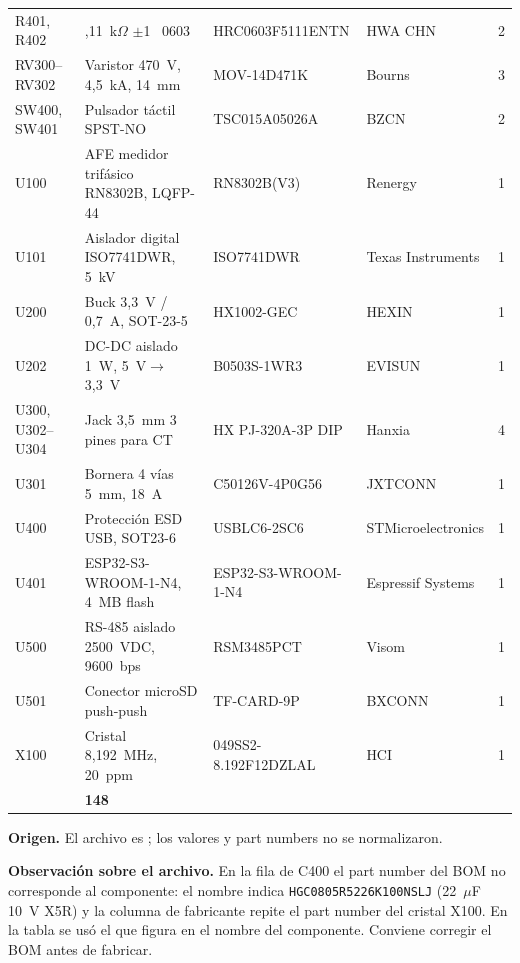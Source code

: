 \documentclass[11pt,a4paper]{article}
\newcommand{\pct}{\text{\char37}}
\begin{document}
\begin{landscape}
\begin{longtable}{@{}>{\raggedright\arraybackslash}p{7.2cm}>{\raggedright\arraybackslash}p{6.0cm}>{\raggedright\arraybackslash}p{3.9cm}>{\raggedright\arraybackslash}p{4.5cm}r@{}}
R401, R402 & 5,11~k$\Omega$ $\pm$1~\pct{} 0603 & HRC0603F5111ENTN & HWA CHN & 2 \\
RV300--RV302 & Varistor 470~V, 4,5~kA, 14~mm & MOV-14D471K & Bourns & 3 \\
SW400, SW401 & Pulsador t\'actil SPST-NO & TSC015A05026A & BZCN & 2 \\
U100 & AFE medidor trif\'asico RN8302B, LQFP-44 & RN8302B(V3) & Renergy & 1 \\
U101 & Aislador digital ISO7741DWR, 5~kV & ISO7741DWR & Texas Instruments & 1 \\
U200 & Buck 3,3~V / 0,7~A, SOT-23-5 & HX1002-GEC & HEXIN & 1 \\
U202 & DC-DC aislado 1~W, 5~V$\to$3,3~V & B0503S-1WR3 & EVISUN & 1 \\
U300, U302--U304 & Jack 3,5~mm 3 pines para CT & HX PJ-320A-3P DIP & Hanxia & 4 \\
U301 & Bornera 4 v\'ias 5~mm, 18~A & C50126V-4P0G56 & JXTCONN & 1 \\
U400 & Protecci\'on ESD USB, SOT23-6 & USBLC6-2SC6 & STMicroelectronics & 1 \\
U401 & ESP32-S3-WROOM-1-N4, 4~MB flash & ESP32-S3-WROOM-1-N4 & Espressif Systems & 1 \\
U500 & RS-485 aislado 2500~VDC, 9600~bps & RSM3485PCT & Visom & 1 \\
U501 & Conector microSD push-push & TF-CARD-9P & BXCONN & 1 \\
X100 & Cristal 8,192~MHz, 20~ppm & 049SS2-8.192F12DZLAL & HCI & 1 \\
\midrule
\multicolumn{4}{r}{\textbf{Total}} & \textbf{148} \\
\end{longtable}
\end{landscape}
\pagestyle{fancy}

\noindent\textbf{Origen.} El archivo es
; los valores y part numbers no
se normalizaron.

\noindent\textbf{Observación sobre el archivo.} En la fila de C400 el part
number del BOM no corresponde al componente: el nombre indica
\texttt{HGC0805R5226K100NSLJ} (22~$\mu$F 10~V X5R) y la columna de fabricante
repite el part number del cristal X100. En la tabla se usó el que figura en el
nombre del componente. Conviene corregir el BOM antes de fabricar.

\label{sec:referencias}
\end{document}
